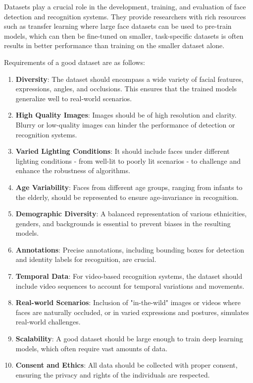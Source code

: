 Datasets play a crucial role in the development, training, and evaluation of face detection and recognition systems. They provide researchers with rich resources such as transfer learning where large face datasets can be used to pre-train models, which can then be fine-tuned on smaller, task-specific datasets is often results in better performance than training on the smaller dataset alone.

Requirements of a good dataset are as follows:

\begin{enumerate}
    \item \textbf{Diversity}: The dataset should encompass a wide variety of facial features, expressions, angles, and occlusions. This ensures that the trained models generalize well to real-world scenarios.

    \item \textbf{High Quality Images}: Images should be of high resolution and clarity. Blurry or low-quality images can hinder the performance of detection or recognition systems.

    \item \textbf{Varied Lighting Conditions}: It should include faces under different lighting conditions - from well-lit to poorly lit scenarios - to challenge and enhance the robustness of algorithms.

    \item \textbf{Age Variability}: Faces from different age groups, ranging from infants to the elderly, should be represented to ensure age-invariance in recognition.

    \item \textbf{Demographic Diversity}: A balanced representation of various ethnicities, genders, and backgrounds is essential to prevent biases in the resulting models.

    \item \textbf{Annotations}: Precise annotations, including bounding boxes for detection and identity labels for recognition, are crucial.

    \item \textbf{Temporal Data}: For video-based recognition systems, the dataset should include video sequences to account for temporal variations and movements.

    \item \textbf{Real-world Scenarios}: Inclusion of "in-the-wild" images or videos where faces are naturally occluded, or in varied expressions and postures, simulates real-world challenges.

    \item \textbf{Scalability}: A good dataset should be large enough to train deep learning models, which often require vast amounts of data.

    \item \textbf{Consent and Ethics}: All data should be collected with proper consent, ensuring the privacy and rights of the individuals are respected.
\end{enumerate}



